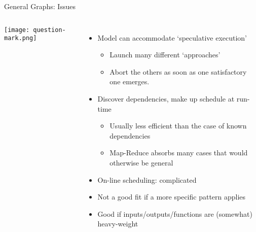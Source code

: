 \documentclass[english,compress]{beamer}
\begin{document}
\begin{frame}{General Graphs: Issues}
  \begin{columns}
      \texttt{[image: question-mark.png]}
      \begin{itemize}
        \item Model can accommodate `speculative execution'
          \begin{itemize}
            \item Launch many different `approaches'
            \item Abort the others as soon as one satisfactory one
            emerges.
          \end{itemize}

        \item Discover dependencies, make up schedule at run-time%
          \begin{itemize}
            \item Usually less efficient than the case of known
            dependencies
            \item Map-Reduce absorbs many cases that would otherwise
            be general
          \end{itemize}
        \item On-line scheduling: complicated
        \item Not a good fit if a more specific pattern applies
        \item Good if inputs/outputs/functions are (somewhat) heavy-weight
      \end{itemize}
  \end{columns}
\end{frame}




\questionframe{}
\imagecreditslide
\end{document}
